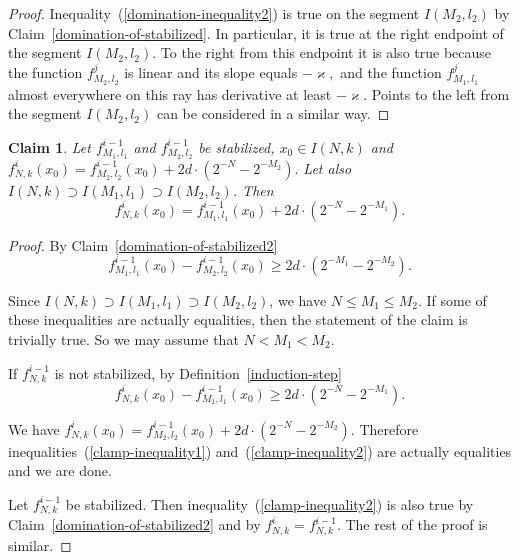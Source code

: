\documentclass[12pt]{article}
\newtheorem{clai}[prop]{Claim}
\theoremstyle{definition}
\begin{document}
\begin{proof}
Inequality~(\ref{domination-inequality2}) is true on the segment $I(M_2,l_2)$ by Claim~\ref{domination-of-stabilized}. In particular, it is true at the right endpoint of the segment $I(M_2,l_2)$. To the right from this endpoint it is also true because the function $f_{M_2, l_2}^j$ is linear and its slope equals $-\varkappa,$ and the function $f_{M_1, l_1}^j$ almost everywhere on this ray has derivative at least $-\varkappa.$ Points to the left from the segment $I(M_2, l_2)$ can be considered in a similar way.
\end{proof}

\begin{clai}
\label{clamp-claim}
Let $f_{M_1, l_1}^{i-1}$ and $f_{M_2, l_2}^{i-1}$ be stabilized, $x_0\in I(N,k)$ and $f_{N,k}^i(x_0) = f_{M_2,l_2}^{i-1}(x_0) + 2d\cdot\left(2^{-N} - 2^{-M_2}\right).$ Let also $I(N,k)\supset I(M_1,l_1)\supset I(M_2,l_2)$. Then 
$$f_{N,k}^i(x_0) = f_{M_1,l_1}^{i-1}(x_0) + 2d\cdot\left(2^{-N} - 2^{-M_1}\right).$$
\end{clai}

\begin{proof}
By Claim~\ref{domination-of-stabilized2} 
\begin{equation}
\label{clamp-inequality1}
f_{M_1, l_1}^{i-1}(x_0) - f_{M_2, l_2}^{i-1}(x_0) \ge 2d\cdot \left(2^{-M_1} - 2^{-M_2}\right).
\end{equation}

Since $I(N,k)\supset I(M_1,l_1)\supset I(M_2,l_2)$,  we have $N \le M_1 \le M_2.$ If some of these inequalities are actually equalities, then the statement of the claim is trivially true. So we may assume that $N < M_1 < M_2.$

If $f_{N,k}^{i-1}$ is not stabilized, by Definition~\ref{induction-step}
\begin{equation}
\label{clamp-inequality2}
f_{N, k}^{i}(x_0) - f_{M_1, l_1}^{i-1}(x_0) \ge 2d\cdot \left(2^{-N} - 2^{-M_1}\right).
\end{equation}

We have $f_{N,k}^i(x_0) = f_{M_2,l_2}^{i-1}(x_0) + 2d\cdot(2^{-N} - 2^{-M_2}).$ Therefore inequalities~(\ref{clamp-inequality1}) and~(\ref{clamp-inequality2}) are actually equalities and we are done.

Let $f_{N,k}^{i-1}$ be stabilized. Then inequality~(\ref{clamp-inequality2}) is also true by Claim~\ref{domination-of-stabilized2} and by $f_{N,k}^{i}=f_{N,k}^{i-1}.$ The rest of the proof is similar.
\end{proof}
\end{document}
